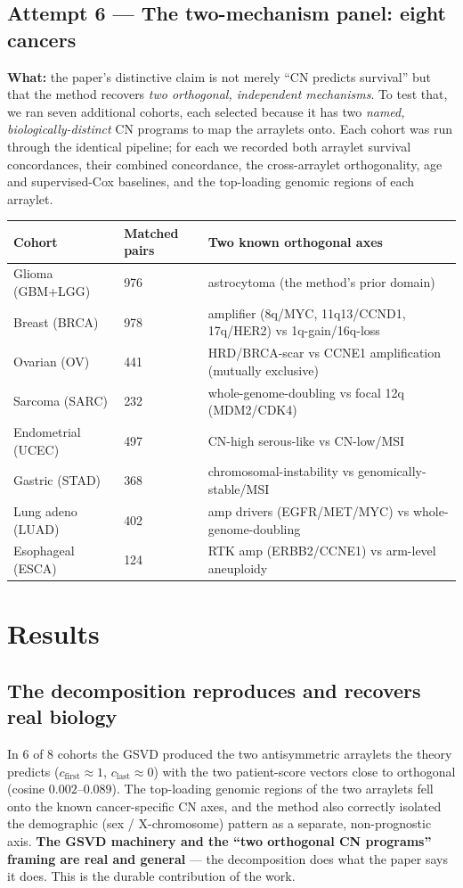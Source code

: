 \documentclass[11pt]{article}
\begin{document}
\subsection{Attempt 6 --- The two-mechanism panel: eight cancers}
\textbf{What:} the paper's distinctive claim is not merely ``CN predicts
survival'' but that the method recovers \emph{two orthogonal, independent
mechanisms}. To test that, we ran seven additional cohorts, each selected because
it has two \emph{named, biologically-distinct} CN programs to map the arraylets
onto. Each cohort was run through the identical pipeline; for each we recorded both
arraylet survival concordances, their combined concordance, the cross-arraylet
orthogonality, age and supervised-Cox baselines, and the top-loading genomic
regions of each arraylet.

\begin{center}
\small
\begin{tabular}{@{}lll@{}}
\toprule
\textbf{Cohort} & \textbf{Matched pairs} & \textbf{Two known orthogonal axes} \\
\midrule
Glioma (GBM+LGG) & 976 & astrocytoma (the method's prior domain) \\
Breast (BRCA)    & 978 & amplifier (8q/MYC, 11q13/CCND1, 17q/HER2) vs 1q-gain/16q-loss \\
Ovarian (OV)     & 441 & HRD/BRCA-scar vs CCNE1 amplification (mutually exclusive) \\
Sarcoma (SARC)   & 232 & whole-genome-doubling vs focal 12q (MDM2/CDK4) \\
Endometrial (UCEC)& 497 & CN-high serous-like vs CN-low/MSI \\
Gastric (STAD)   & 368 & chromosomal-instability vs genomically-stable/MSI \\
Lung adeno (LUAD)& 402 & amp drivers (EGFR/MET/MYC) vs whole-genome-doubling \\
Esophageal (ESCA)& 124 & RTK amp (ERBB2/CCNE1) vs arm-level aneuploidy \\
\bottomrule
\end{tabular}
\end{center}

\section{Results}

\subsection{The decomposition reproduces and recovers real biology}
In 6 of 8 cohorts the GSVD produced the two antisymmetric arraylets the theory
predicts ($c_{\text{first}}\!\approx\!1$, $c_{\text{last}}\!\approx\!0$) with the
two patient-score vectors close to orthogonal (cosine $0.002$--$0.089$). The
top-loading genomic regions of the two arraylets fell onto the known
cancer-specific CN axes, and the method also correctly isolated the demographic
(sex / X-chromosome) pattern as a separate, non-prognostic axis. \textbf{The GSVD
machinery and the ``two orthogonal CN programs'' framing are real and general} ---
the decomposition does what the paper says it does. This is the durable
contribution of the work.
\end{document}
